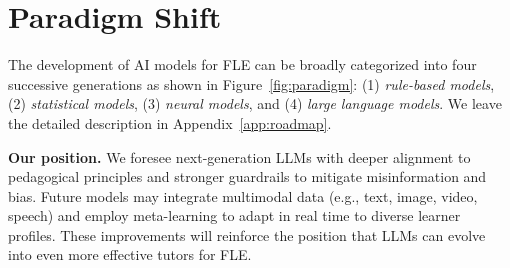 \section{Paradigm Shift}\label{sec:paradigm}

The development of AI models for FLE can be broadly categorized into four successive generations as shown in Figure~\ref{fig:paradigm}: (1) \textit{rule-based models}, (2) \textit{statistical models}, (3) \textit{neural models}, and (4) \textit{large language models}. We leave the detailed description in Appendix~\ref{app:roadmap}.

\begin{tcolorbox}[top=1pt, bottom=1pt, left=1pt, right=1pt]
\textbf{Our position.} We foresee next-generation LLMs with deeper alignment to pedagogical principles and stronger guardrails to mitigate misinformation and bias. Future models may integrate multimodal data (e.g., text, image, video, speech) and employ meta-learning to adapt in real time to diverse learner profiles. These improvements will reinforce the position that LLMs can evolve into even more effective tutors for FLE.
\end{tcolorbox}



